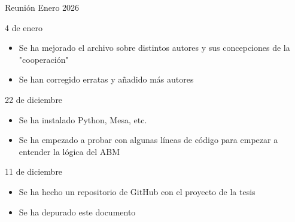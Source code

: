 \documentclass[a4paper,11pt]{article}
\begin{document}
    \begin{seccionbox}[violetasuave]{Reunión Enero 2026}
        \begin{updateo}{4 de enero}
            \begin{itemize}
                \item Se ha mejorado el archivo sobre distintos autores y sus concepciones de la "cooperación"
                \item Se han corregido erratas y añadido más autores
            \end{itemize} 
        \end{updateo}
         \begin{updateo}{22 de diciembre}
            \begin{itemize}
                \item Se ha instalado Python, Mesa, etc.
                \item Se ha empezado a probar con algunas líneas de código para empezar a entender la lógica del ABM
            \end{itemize} 
        \end{updateo}
        \begin{updateo}{11 de diciembre}
            \begin{itemize}
                \item Se ha hecho un repositorio de GitHub con el proyecto de la tesis 
                \item Se ha depurado este documento
            \end{itemize} 
        \end{updateo}
    \end{seccionbox}
\end{document}
